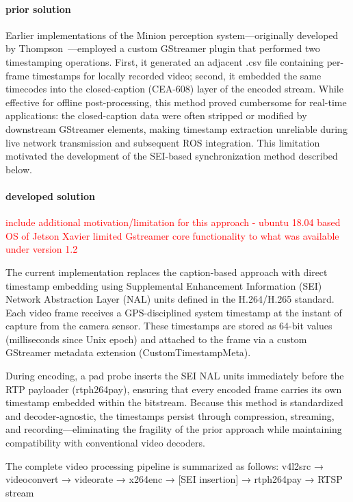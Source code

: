 \documentclass{erauthesis}
\begin{document}
\paragraph{prior solution}
Earlier implementations of the Minion perception system—originally developed by Thompson~\cite{thompson2023}—employed a custom GStreamer plugin that performed two timestamping operations.
First, it generated an adjacent .csv file containing per-frame timestamps for locally recorded video; second, it embedded the same timecodes into the closed-caption (CEA-608) layer of the encoded stream.
While effective for offline post-processing, this method proved cumbersome for real-time applications: the closed-caption data were often stripped or modified by downstream GStreamer elements, making timestamp extraction unreliable during live network transmission and subsequent ROS integration.
This limitation motivated the development of the SEI-based synchronization method described below.

\paragraph{developed solution}

\textcolor{red}{include additional motivation/limitation for this approach - ubuntu 18.04 based OS of Jetson Xavier limited Gstreamer core functionality to what was available under version 1.2}

The current implementation replaces the caption-based approach with direct timestamp embedding using Supplemental Enhancement Information (SEI) Network Abstraction Layer (NAL) units defined in the H.264/H.265 standard.
Each video frame receives a GPS-disciplined system timestamp at the instant of capture from the camera sensor. These timestamps are stored as 64-bit values (milliseconds since Unix epoch) and attached to the frame via a custom GStreamer metadata extension (CustomTimestampMeta).

During encoding, a pad probe inserts the SEI NAL units immediately before the RTP payloader (rtph264pay), ensuring that every encoded frame carries its own timestamp embedded within the bitstream.
Because this method is standardized and decoder-agnostic, the timestamps persist through compression, streaming, and recording—eliminating the fragility of the prior approach while maintaining compatibility with conventional video decoders.

The complete video processing pipeline is summarized as follows:
v4l2src → videoconvert → videorate → x264enc → [SEI insertion] → rtph264pay → RTSP stream
\end{document}
